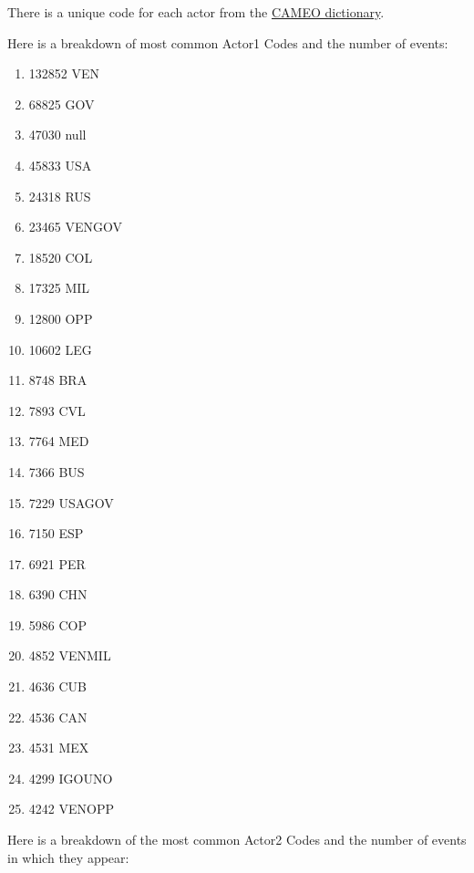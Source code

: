 There is a unique code for each actor from the \href{http://data.gdeltproject.org/documentation/CAMEO.Manual.1.1b3.pdf}{CAMEO dictionary}.

Here is a breakdown of most common Actor1 Codes and the number of events:
\begin{enumerate}  
\item 132852	\quad VEN
\item 68825	\quad GOV
\item 47030	\quad null
\item 45833	\quad USA
\item 24318	\quad RUS
\item 23465	\quad VENGOV
\item 18520 	\quad COL
\item 17325	\quad MIL
\item 12800	\quad OPP
\item 10602	\quad LEG
\item 8748		\quad BRA
\item 7893		\quad CVL
\item 7764		\quad MED
\item 7366		\quad BUS
\item 7229		\quad USAGOV
\item 7150		\quad ESP
\item 6921		\quad PER
\item 6390		\quad CHN
\item 5986		\quad COP
\item 4852		\quad VENMIL
\item 4636		\quad CUB
\item 4536		\quad CAN
\item 4531		\quad MEX
\item 4299		\quad IGOUNO
\item 4242		\quad VENOPP 
\end{enumerate}

Here is a breakdown of the most common Actor2 Codes and the number of events in which they appear:

